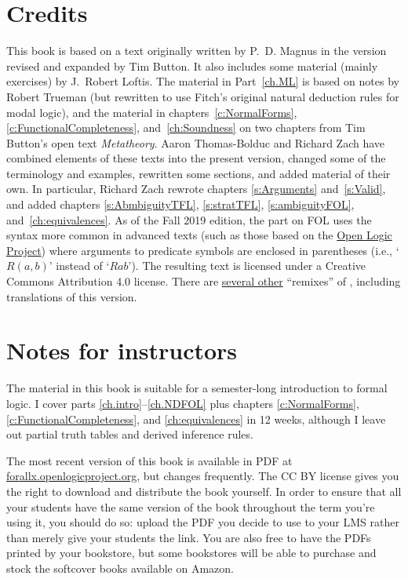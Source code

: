 \section{Credits} This book is based on a text originally written by P.~D. Magnus in the version revised and expanded by Tim Button. It also includes some material (mainly exercises) by J.~Robert Loftis. The material in Part~\ref{ch.ML} is based on notes by Robert Trueman (but rewritten to use Fitch's original natural deduction rules for modal logic), and the material in chapters~\ref{c:NormalForms}, \ref{c:FunctionalCompleteness}, and~\ref{ch:Soundness} on two chapters from Tim Button's open text \textit{Metatheory}. Aaron Thomas-Bolduc and Richard Zach have combined elements of these texts into the present version, changed some of the terminology and examples, rewritten some sections, and added material of their own.  In particular, Richard Zach rewrote chapters \ref{s:Arguments} and~\ref{s:Valid}, and added chapters \ref{s:AbmbiguityTFL}, \ref{s:stratTFL}, \ref{s:ambiguityFOL}, and~\ref{ch:equivalences}. As of the Fall 2019 edition, the part on FOL uses the syntax more common in advanced texts (such as those based on the \href{https://openlogicproject.org/}{Open Logic Project}) where arguments to predicate symbols are enclosed in parentheses (i.e., `$R(a,b)$' instead of `$Rab$'). The resulting text is licensed under a Creative Commons Attribution 4.0 license. There are \href{https://github.com/OpenLogicProject/OpenLogic/wiki/Other-Logic-Textbooks}{several other} ``remixes'' of \forallx, including translations of this version.

\section{Notes for instructors} The material in this book is suitable for a semester-long introduction to formal logic. I cover parts \ref{ch.intro}--\ref{ch.NDFOL} plus chapters \ref{c:NormalForms}, \ref{c:FunctionalCompleteness}, and \ref{ch:equivalences} in 12 weeks, although I leave out partial truth tables and derived inference rules.

The most recent version of this book is available in PDF at \href{https://forallx.openlogicproject.org}{forallx.openlogicproject.org}, but changes frequently.  The CC BY license gives you the right to download and distribute the book yourself. In order to ensure that all your students have the same version of the book throughout the term you're using it, you should do so: upload the PDF you decide to use to your LMS rather than merely give your students the link. You are also free to have the PDFs printed by your bookstore, but some bookstores will be able to purchase and stock the softcover books available on Amazon.

